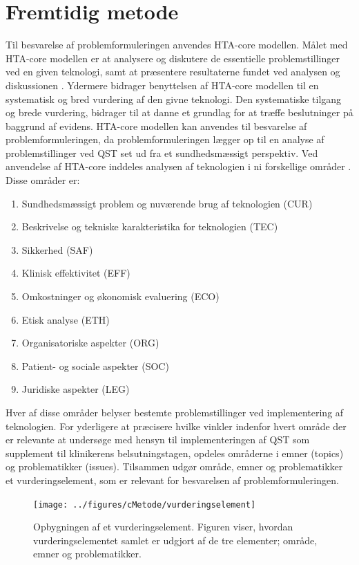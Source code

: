\section{Fremtidig metode}
Til besvarelse af problemformuleringen anvendes HTA-core modellen. Målet med HTA-core modellen er at analysere og diskutere de essentielle problemstillinger ved en given teknologi, samt at præsentere resultaterne fundet ved analysen og diskussionen \citep{HTAcore}. Ydermere bidrager benyttelsen af HTA-core modellen til en systematisk og bred vurdering af den givne teknologi. Den systematiske tilgang og brede vurdering‚ bidrager til  at danne et grundlag for at træffe beslutninger på baggrund af evidens. \citep{mtvhaandbog2007} \citep{HTAcore}  HTA-core modellen kan anvendes til besvarelse af problemformuleringen, da problemformuleringen lægger op til en analyse af problemstillinger ved QST set ud fra et sundhedsmæssigt perspektiv. Ved anvendelse af HTA-core inddeles analysen af teknologien i ni forskellige områder \citep{HTAcore}. Disse områder er: 

\begin{enumerate}
	\item Sundhedsmæssigt problem og nuværende brug af teknologien (CUR)
	\item Beskrivelse og tekniske karakteristika for teknologien (TEC)
	\item Sikkerhed (SAF)
	\item Klinisk effektivitet (EFF)
	\item Omkostninger og økonomisk evaluering (ECO)
	\item Etisk analyse (ETH)
	\item Organisatoriske aspekter (ORG)
	\item Patient- og sociale aspekter (SOC)
	\item Juridiske aspekter (LEG)
\end{enumerate}

Hver af disse områder belyser bestemte problemstillinger ved implementering af teknologien. For yderligere at præcisere hvilke vinkler indenfor hvert område der er relevante at undersøge med hensyn til implementeringen af QST som supplement til klinikerens belsutningstagen, opdeles områderne i emner (topics) og problematikker (issues). Tilsammen udgør område, emner og problematikker et vurderingselement, som er relevant for besvarelsen af problemformuleringen.

\begin{figure}[H] 
	\begin{center}
		\texttt{[image: ../figures/cMetode/vurderingselement]}
	\end{center}
	\caption{Opbygningen af et vurderingselement. Figuren viser, hvordan vurderingselementet samlet er udgjort af de tre elementer; område, emner og problematikker.} 
	\label{fig:vurderingselement} 
\end{figure} \vspace{-.50cm}

